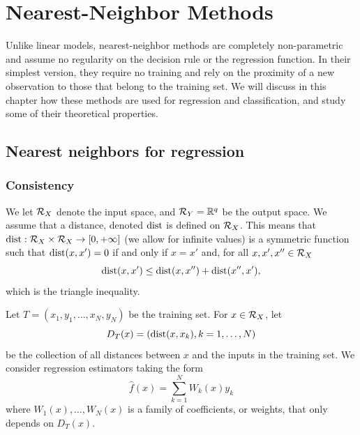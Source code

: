\chapter{Nearest-Neighbor Methods}
\label{chap:nearest.neighbors}

Unlike linear models,  nearest-neighbor methods  are completely non-parametric and
assume no regularity on the decision rule or the regression
function. In their simplest version, they require no training and rely
on the proximity of a new observation to those that belong to the
training set. We will discuss in this chapter how these methods are used for regression and classification, and study some of their theoretical properties.

\section{Nearest neighbors for regression}
\subsection{Consistency}
We let ${\mathcal R}_X$ denote the input space, and ${\mathcal R}_Y={\mathbb{R}}^q$ be the output space. We assume that a distance, denoted $\operatorname{dist}$ is defined on ${\mathcal R}_X$. This means that $\operatorname{dist}: {\mathcal R}_X\times {\mathcal R}_X\to [0, +\infty]$ (we allow for infinite values) is a symmetric function such that $\operatorname{dist}(x, x') = 0$ if and only if $x=x'$ and, for all $x,x',x''\in {\mathcal R}_X$
\[
\operatorname{dist}(x,x') \leq \operatorname{dist}(x,x'') + \operatorname{dist}(x'',x'),
\]
which is the triangle inequality.



Let $T = (x_1, y_1, \ldots, x_N, y_N)$ be the
training set. For $x\in{\mathcal R}_X$, let 
\[
D_T(x) = (\operatorname{dist}(x, x_k), k=1, \ldots, N)
\]
 be the collection of all distances between $x$ and the inputs in the training set. 
We consider  regression estimators taking the form 
\begin{equation}
\label{eq:nn.general}
\hat f(x) = \sum_{k=1}^N W_k(x) y_k
\end{equation}
where $W_1(x), \ldots, W_N(x)$ is a family of coefficients, or weights, that only depends on $D_T(x)$.

